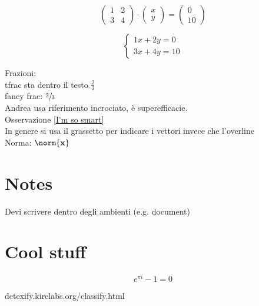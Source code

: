 \documentclass[10pt,a4paper]{article}
\theoremstyle{plain}
\theoremstyle{definition}
\begin{document}
$$
\begin{pmatrix}
	1 & 2 \\
	3 & 4
\end{pmatrix}
\cdot
\begin{pmatrix}
	x \\
	y
\end{pmatrix}
=
\begin{pmatrix}
	0 \\
	10
\end{pmatrix}
$$

$$
\begin{cases}
	1x+2y=0 \\
	3x+4y=10
\end{cases}
$$

Frazioni: \\
tfrac sta dentro il testo $\tfrac{2}{3}$ \\
fancy frac: $\sfrac{2}{3}$ \\


Andrea usa riferimento incrociato, è superefficacie.\\
Osservazione \ref{I'm so smart}\\

In genere si usa il grassetto per indicare i vettori invece che l'overline\\
Norma: $\norm{\mathbf{x}}$
\section{Notes}
Devi scrivere dentro degli ambienti (e.g. document)

\section{Cool stuff}
$$
e^{\pi i} - 1 = 0
$$

detexify.kirelabs.org/classify.html
\end{document}
